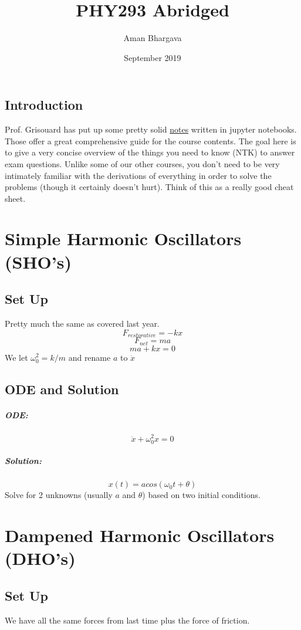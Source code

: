 \documentclass[a4paper,12pt]{report}
\begin{document}
\title{PHY293 Abridged}
\author{Aman Bhargava}
\date{September 2019}
\maketitle

\tableofcontents

\section{Introduction}
Prof. Grisouard has put up some pretty solid 
\href{https://github.com/PHY293-Grisouard/Chapters-2019}{notes} written in jupyter notebooks. 
Those offer a great comprehensive guide for the course contents. The goal here is to give
a very concise overview of the things you need to know (NTK) to answer exam questions. Unlike
some of our other courses, you don't need to be very intimately familiar with the derivations
of everything in order to solve the problems (though it certainly doesn't hurt). Think of this 
as a really good cheat sheet.

\chapter{Simple Harmonic Oscillators (SHO's)}
\section{Set Up}
Pretty much the same as covered last year.
$$F_{restorative} = -kx$$
$$F_{net} = ma$$
$$ma + kx = 0$$
We let $\omega_0^2 = k/m$ and rename $a$ to $\ddot{x}$
\section{ODE and Solution}
\paragraph{ODE:}
$$\ddot{x} + \omega_0^2 x = 0$$
\paragraph{Solution:}
$$x(t) = a cos(\omega_0 t + \theta)$$
Solve for 2 unknowns (usually $a$ and $\theta$) based on two initial conditions.

\chapter{Dampened Harmonic Oscillators (DHO's)}
\section{Set Up}
We have all the same forces from last time plus the force of friction.
\end{document}
